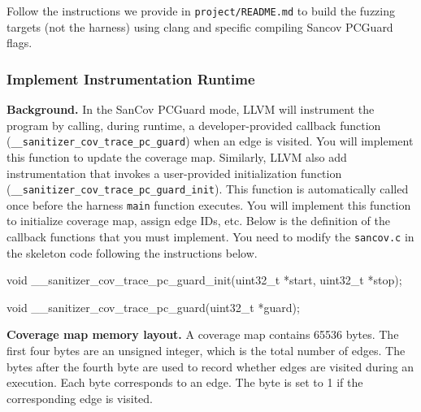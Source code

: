 \documentclass[letterpaper,11pt]{article}
\begin{document}
Follow the instructions we provide in \texttt{project/README.md} to build the fuzzing targets (not the harness) using clang and specific compiling Sancov PCGuard flags.



\subsubsection{Implement Instrumentation Runtime}
\label{sec:implruntime}

\textbf{Background.} In the SanCov PCGuard mode, LLVM will instrument the program by calling, during runtime, a developer-provided callback function (\texttt{__sanitizer_cov_trace_pc_guard}) when an edge is visited.
You will implement this function to update the coverage map.
Similarly, LLVM also add instrumentation that invokes a user-provided initialization function (\texttt{__sanitizer_cov_trace_pc_guard_init}). This function is automatically called once before the harness \texttt{main} function executes.
You will implement this function to initialize coverage map, assign edge IDs, etc.
Below is the definition of the callback functions that you must implement.
You need to modify the \texttt{sancov.c} in the skeleton code following the instructions below.


\begin{code}
void __sanitizer_cov_trace_pc_guard_init(uint32_t *start,
                                                    uint32_t *stop);

void __sanitizer_cov_trace_pc_guard(uint32_t *guard);
\end{code}

\textbf{Coverage map memory layout.}
A coverage map contains 65536 bytes.
The first four bytes are an unsigned integer, which is the total number of edges.
The bytes after the fourth byte are used to record whether edges are visited during an execution.
Each byte corresponds to an edge.
The byte is set to 1 if the corresponding edge is visited.



\end{document}

